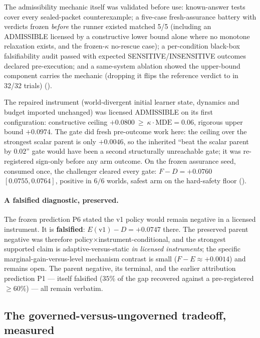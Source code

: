 The admissibility mechanic itself was validated before use: known-answer tests cover
every sealed-packet counterexample; a five-case fresh-assurance battery with verdicts
frozen \emph{before} the runner existed matched 5/5 (including an ADMISSIBLE licensed
by a constructive lower bound alone where no monotone relaxation exists, and the
frozen-$\kappa$ no-rescue case); a per-condition black-box falsifiability audit passed
with expected SENSITIVE/INSENSITIVE outcomes declared pre-execution; and a
same-system ablation showed the upper-bound component carries the mechanic (dropping
it flips the reference verdict to \CANNOTCHECK{} in 32/32 trials)
().

The repaired instrument (world-divergent initial learner state, dynamics and budget
imported unchanged) was licensed ADMISSIBLE on its first configuration: constructive
ceiling $+0.0800\ \ge\ \kappa\cdot\mathrm{MDE}=0.06$, rigorous upper bound $+0.0974$.
The gate did fresh pre-outcome work here: the ceiling over the strongest scalar parent
is only $+0.0046$, so the inherited ``beat the scalar parent by $0.02$'' gate would
have been a second structurally unreachable gate; it was re-registered sign-only
before any arm outcome. On the frozen assurance seed, consumed once, the challenger
cleared every gate: $F-D=+0.0760$ $[0.0755,0.0764]$, positive in $6/6$ worlds, safest
arm on the hard-safety floor
().

\paragraph{A falsified diagnostic, preserved.} The frozen prediction P6 stated the v1
policy would remain negative in a licensed instrument. It is \textbf{falsified}:
$E(\text{v1})-D=+0.0747$ there. The preserved parent negative was therefore
policy$\times$instrument-conditional, and the strongest supported claim is
adaptive-versus-static \emph{in licensed instruments}; the specific
marginal-gain-versus-level mechanism contrast is small ($F-E\approx+0.0014$) and
remains open. The parent negative, its terminal, and the earlier attribution
prediction P1 --- itself falsified ($35\%$ of the gap recovered against a
pre-registered $\ge 60\%$) --- all remain verbatim.

\subsection{The governed-versus-ungoverned tradeoff, measured}
\label{sec:tradeoff-experiment}

